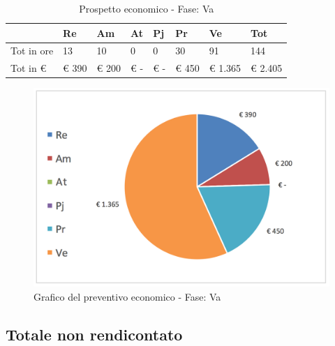 							\begin{table}[H] \begin{center} \begin{tabular}{llllllll}
							\toprule
								&	\textbf{Re}	&	\textbf{Am}	&	\textbf{At}	&	\textbf{Pj}	&	\textbf{Pr}	&	\textbf{Ve}	&	\textbf{Tot}\\

							\midrule
							Tot in ore	&	13	&	10	&	0	&	0	&	30	&	91	&	144	 \\


							Tot in €	&	 €     390 	 & 	 €      200 	 & 	 €         -   	 & 	 €         -   	 & 	 €    450 	 & 	 €  1.365 	 & 	 €     2.405 	 \\
							\bottomrule
							\end{tabular} \end{center} \caption{Prospetto economico - Fase:
							Va
							}\label{tab:s_Va} \end{table}		\begin{figure}[H]  \centering  \includegraphics[scale=0.40]{img/s_Va}
									\caption{Grafico del preventivo economico - Fase: 								Va	}  \label{fig:s_Va	} \end{figure}

	\newpage
	\subsection {Totale non rendicontato}
